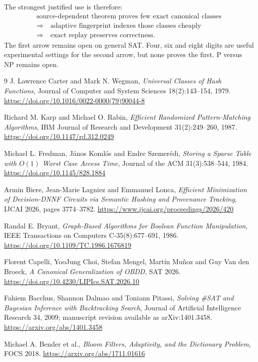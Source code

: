 \documentclass[11pt]{article}
\begin{document}
The strongest justified use is therefore:
\[
\begin{gathered}
\text{source-dependent theorem proves few exact canonical classes}\\
\Longrightarrow\quad
\text{adaptive fingerprint indexes those classes cheaply}\\
\Longrightarrow\quad
\text{exact replay preserves correctness.}
\end{gathered}
\]
The first arrow remains open on general SAT.  Four, six and eight digits are
useful experimental settings for the second arrow, but none proves the first.
P versus NP remains open.

\begin{thebibliography}{9}
J. Lawrence Carter and Mark N. Wegman,
\emph{Universal Classes of Hash Functions},
Journal of Computer and System Sciences 18(2):143--154, 1979.
\url{https://doi.org/10.1016/0022-0000(79)90044-8}

Richard M. Karp and Michael O. Rabin,
\emph{Efficient Randomized Pattern-Matching Algorithms},
IBM Journal of Research and Development 31(2):249--260, 1987.
\url{https://doi.org/10.1147/rd.312.0249}

Michael L. Fredman, J\'anos Koml\'os and Endre Szemer\'edi,
\emph{Storing a Sparse Table with $O(1)$ Worst Case Access Time},
Journal of the ACM 31(3):538--544, 1984.
\url{https://doi.org/10.1145/828.1884}

Armin Biere, Jean-Marie Lagniez and Emmanuel Lonca,
\emph{Efficient Minimization of Decision-DNNF Circuits via Semantic Hashing
and Provenance Tracking}, IJCAI 2026, pages 3774--3782.
\url{https://www.ijcai.org/proceedings/2026/420}

Randal E. Bryant,
\emph{Graph-Based Algorithms for Boolean Function Manipulation},
IEEE Transactions on Computers C-35(8):677--691, 1986.
\url{https://doi.org/10.1109/TC.1986.1676819}

Florent Capelli, YooJung Choi, Stefan Mengel, Mart\'in Mu\~noz and
Guy Van den Broeck,
\emph{A Canonical Generalization of OBDD}, SAT 2026.
\url{https://doi.org/10.4230/LIPIcs.SAT.2026.10}

Fahiem Bacchus, Shannon Dalmao and Toniann Pitassi,
\emph{Solving \#SAT and Bayesian Inference with Backtracking Search},
Journal of Artificial Intelligence Research 34, 2009; manuscript revision
available as arXiv:1401.3458.
\url{https://arxiv.org/abs/1401.3458}

Michael A. Bender et al.,
\emph{Bloom Filters, Adaptivity, and the Dictionary Problem},
FOCS 2018.
\url{https://arxiv.org/abs/1711.01616}
\end{thebibliography}
\end{document}
